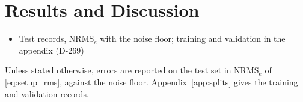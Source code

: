\section{Results and Discussion}\label{sec:results}
\ifdraft
\begin{itemize}
\item Test records, $\mathrm{NRMS}_e$ with the noise floor; training and validation in the appendix (D-269)
\end{itemize}
\fi
\changelegend
Unless stated otherwise, errors are reported on the test set in $\mathrm{NRMS}_e$ of \eqref{eq:setup_rms},
against the noise floor.
Appendix~\ref{app:splits} gives the training and validation records.
%

